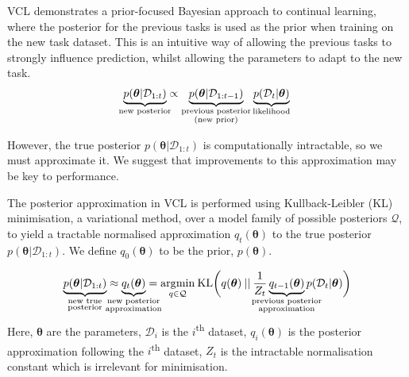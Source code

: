 \documentclass[a4paper,11=0pt]{article}
\let\boldtheta\theta %
\renewcommand{\theta}{\boldsymbol{\boldtheta}} %
\begin{document}
VCL demonstrates a prior-focused Bayesian approach to continual learning, where the posterior for the previous tasks is used as the prior when training on the new task dataset. This is an intuitive way of allowing the previous tasks to strongly influence prediction, whilst allowing the parameters to adapt to the new task. 
\begin{equation}\label{eq:1}
\begin{split}
\underbrace{p(\theta | \mathcal{D}_{1:t})}_{\mathclap{\text{new posterior}}} \propto \underbrace{p(\theta | \mathcal{D}_{1:t-1})}_{\substack{\text{previous posterior}\\ (\text{new prior})}} \underbrace{p(\mathcal{D}_t | \theta)}_{\text{likelihood}}
\end{split}
\end{equation}

\vspace{-0.75em}
However, the true posterior $p(\theta | \mathcal{D}_{1:t})$ is computationally intractable, so we must approximate it. We suggest that improvements to this approximation may be key to performance. 


The posterior approximation in VCL is performed using Kullback-Leibler (KL) minimisation, a variational method, over a model family of possible posteriors $\mathcal{Q}$, to yield a tractable normalised approximation $q_t(\theta)$ to the true posterior $p(\theta | \mathcal{D}_{1:t})$. We define $q_0(\theta)$ to be the prior, $p(\theta)$.

\vspace{-1.7em}
\begin{equation}\label{eq:3}
\begin{split}
\underbrace{p(\theta | \mathcal{D}_{1:t})}_{\mathclap{\substack{\text{new true}\\ \text{posterior}}}}\approx \underbrace{q_t(\theta)}_{\mathclap{\substack{\text{new posterior}\\ \text{approximation}}}} &=\underset{q\in\mathcal{Q}}{\mathrm{arg}\mathrm{min}} \: \mathrm{KL}\bigg(q(\theta)\:||\:\frac{1}{Z_t}\underbrace{q_{t-1}(\theta)}_{\mathclap{\substack{\text{previous posterior} \\ \text{approximation}}}}p(\mathcal{D}_t|\theta) \bigg)\\
\end{split}
\end{equation}
Here, $\theta$ are the parameters, $\mathcal{D}_i$ is the $i$\textsuperscript{th} dataset, $q_i(\theta)$ is the posterior approximation following the $i$\textsuperscript{th} dataset, $Z_t$ is the intractable normalisation constant which is irrelevant for minimisation.
\end{document}

